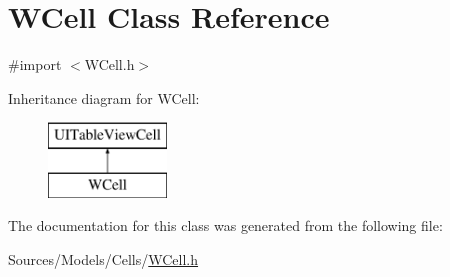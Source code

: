 \hypertarget{interface_w_cell}{\section{W\-Cell Class Reference}
\label{interface_w_cell}
}


{\ttfamily \#import $<$W\-Cell.\-h$>$}

Inheritance diagram for W\-Cell\-:\begin{figure}[H]
\begin{center}
\leavevmode
\includegraphics[height=2.000000cm]{interface_w_cell}
\end{center}
\end{figure}


The documentation for this class was generated from the following file\-:\begin{DoxyCompactItemize}
\item 
Sources/\-Models/\-Cells/\hyperlink{_w_cell_8h}{W\-Cell.\-h}\end{DoxyCompactItemize}

